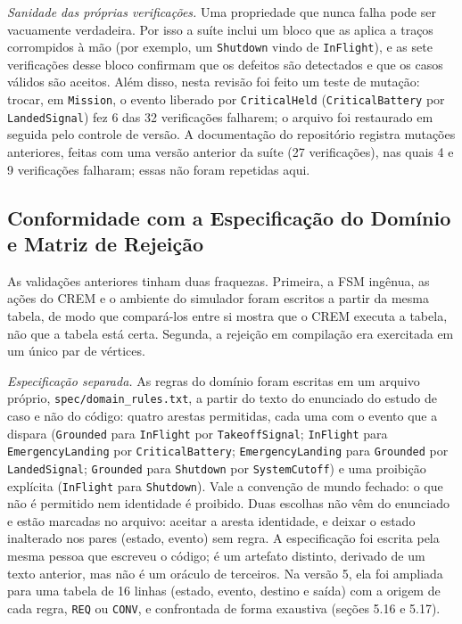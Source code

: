 \documentclass[12pt,a4paper]{article}
\begin{document}
\textit{Sanidade das próprias verificações.} Uma propriedade que nunca falha pode ser vacuamente verdadeira. Por isso a suíte inclui um bloco que as aplica a traços corrompidos à mão (por exemplo, um \texttt{Shutdown} vindo de \texttt{InFlight}), e as sete verificações desse bloco confirmam que os defeitos são detectados e que os casos válidos são aceitos. Além disso, nesta revisão foi feito um teste de mutação: trocar, em \texttt{Mission}, o evento liberado por \texttt{CriticalHeld} (\texttt{CriticalBattery} por \texttt{LandedSignal}) fez 6 das 32 verificações falharem; o arquivo foi restaurado em seguida pelo controle de versão. A documentação do repositório registra mutações anteriores, feitas com uma versão anterior da suíte (27 verificações), nas quais 4 e 9 verificações falharam; essas não foram repetidas aqui.

\subsection{Conformidade com a Especificação do Domínio e Matriz de Rejeição}

As validações anteriores tinham duas fraquezas. Primeira, a FSM ingênua, as ações do CREM e o ambiente do simulador foram escritos a partir da mesma tabela, de modo que compará-los entre si mostra que o CREM executa a tabela, não que a tabela está certa. Segunda, a rejeição em compilação era exercitada em um único par de vértices.

\textit{Especificação separada.} As regras do domínio foram escritas em um arquivo próprio, \texttt{spec/domain\_rules.txt}, a partir do texto do enunciado do estudo de caso e não do código: quatro arestas permitidas, cada uma com o evento que a dispara (\texttt{Grounded} para \texttt{InFlight} por \texttt{TakeoffSignal}; \texttt{InFlight} para \texttt{EmergencyLanding} por \texttt{CriticalBattery}; \texttt{EmergencyLanding} para \texttt{Grounded} por \texttt{LandedSignal}; \texttt{Grounded} para \texttt{Shutdown} por \texttt{SystemCutoff}) e uma proibição explícita (\texttt{InFlight} para \texttt{Shutdown}). Vale a convenção de mundo fechado: o que não é permitido nem identidade é proibido. Duas escolhas não vêm do enunciado e estão marcadas no arquivo: aceitar a aresta identidade, e deixar o estado inalterado nos pares (estado, evento) sem regra. A especificação foi escrita pela mesma pessoa que escreveu o código; é um artefato distinto, derivado de um texto anterior, mas não é um oráculo de terceiros. Na versão 5, ela foi ampliada para uma tabela de 16 linhas (estado, evento, destino e saída) com a origem de cada regra, \texttt{REQ} ou \texttt{CONV}, e confrontada de forma exaustiva (seções 5.16 e 5.17).
\end{document}
